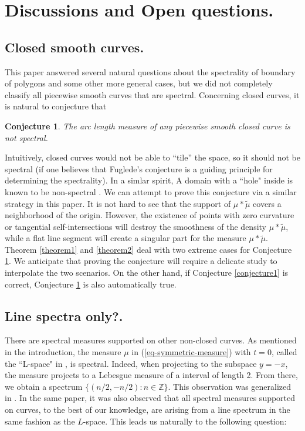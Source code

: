 \documentclass[12pt,a4paper,oneside]{amsart}
\newtheorem{conjecture}{Conjecture}
\theoremstyle{definition}
\newcommand{\ZZ}{{\mathbb Z}}
\newcommand{\wt}[1]{\widetilde{#1}}
\newcounter{rem}
\begin{document}
\section{Discussions and Open questions.}\label{s:problems}

\subsection{Closed smooth curves.}This paper answered several natural questions about the spectrality of boundary of polygons and some other more general cases, but we did not completely classify all piecewise smooth curves that are spectral.  Concerning closed curves, it is natural to conjecture that 

\begin{conjecture}\label{conjecture2}
The arc length measure of any piecewise smooth closed curve is not spectral. 
\end{conjecture}
 Intuitively, closed curves would not be able to ``tile'' the space, so it should not be spectral (if one believes that Fuglede's conjecture is a guiding principle for determining the spectrality). In a simlar spirit, A domain with a ``hole" inside is known to be non-spectral \cite[Theorem 3.5]{lev2022fuglede}. We can attempt to prove this conjecture via a similar strategy in this paper. It is not hard to see that the support of $\mu\ast\wt\mu$ covers a neighborhood of the origin.  However, the existence of points with zero curvature or tangential self-intersections will destroy the smoothness of the density $\mu\ast\wt\mu$, while a flat line segment will create a singular part for the measure $\mu\ast\wt\mu$.  Theorem \ref{theorem1} and \ref{theorem2} deal with two extreme cases for Conjecture \ref{conjecture2}. We anticipate that proving the conjecture  will require a delicate study to interpolate the two scenarios. On the other hand, if Conjecture \ref{conjecture1} is correct, Conjecture \ref{conjecture2} is also automatically true. 

\subsection{Line spectra only?.} There are spectral measures supported on other non-closed curves. As mentioned in the introduction, the measure $\mu$ in (\ref{eq-symmetric-measure}) with $t = 0$, called the ``L-space"  in \cite{lai2021spectral}, is spectral. Indeed, when projecting to the subspace $y = -x$, the measure projects to a Lebesgue measure of a interval of length 2. From there, we obtain a spectrum $\{(n/2,-n/2): n\in\ZZ\}$.  This observation was generalized in  \cite[Theorem 1.2]{kolountzakis2025spectralitymeasureconsistingline}. In the same paper, it was also observed that all spectral measures supported on curves, to the best of our knowledge, are arising from a line spectrum in the same fashion as the $L$-space. This leads us naturally to the following question:
\end{document}

